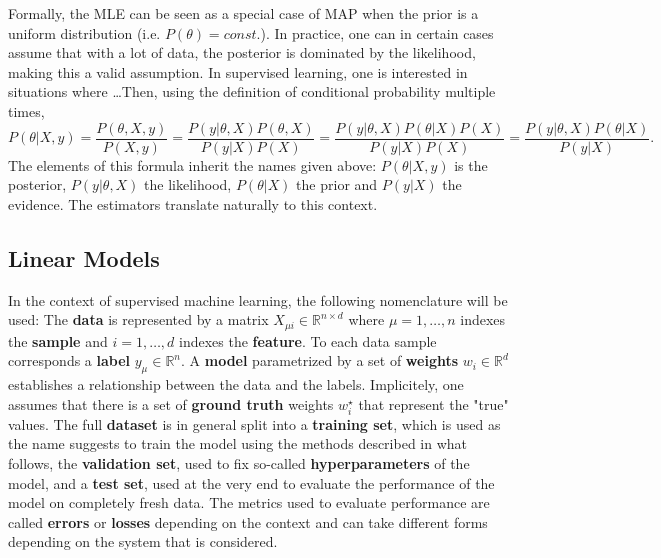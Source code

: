 \documentclass{article}
\begin{document}
Formally, the MLE can be seen as a special case of MAP when the prior is a uniform distribution (i.e. $P(\theta) = const.$). In practice, one can in certain cases assume that with a lot of data, the posterior is dominated by the likelihood, making this a valid assumption.
\restoregeometry
\noindent In supervised learning, one is interested in situations where \dots Then, using the definition of conditional probability multiple times,
\begin{equation}
    P(\theta | X,y) = \frac{P(\theta,X,y)}{P(X,y)}
    =
    \frac{P(y|\theta,X)P(\theta,X)}{P(y|X)P(X)}
    =
    \frac{P(y|\theta,X)P(\theta|X)P(X)}{P(y|X)P(X)}
    =
    \frac{P(y|\theta,X)P(\theta|X)}{P(y|X)}.
    \label{eq:posterior}
\end{equation}
The elements of this formula inherit the names given above: $P(\theta | X,y)$ is the posterior, $P(y|\theta,X)$ the likelihood, $P(\theta|X)$ the prior and $P(y|X)$ the evidence. The estimators translate naturally to this context.
\subsection{Linear Models}
In the context of supervised machine learning, the following nomenclature will be used:
The \textbf{data} is represented by a matrix $X_{\mu i} \in \mathbb{R}^{n \times d}$ where $\mu = 1,\dots,n$ indexes the \textbf{sample} and $i = 1,\dots,d$ indexes the \textbf{feature}. To each data sample corresponds a \textbf{label} $y_{\mu} \in \mathbb{R}^n$. A \textbf{model} parametrized by a set of \textbf{weights} $w_i \in \mathbb{R}^d$ establishes a relationship between the data and the labels. Implicitely, one assumes that there is a set of \textbf{ground truth} weights $w_i^{\star}$ that represent the "true" values. The full \textbf{dataset} is in general split into a \textbf{training set}, which is used as the name suggests to train the model using the methods described in what follows, the \textbf{validation set}, used to fix so-called \textbf{hyperparameters} of the model, and a \textbf{test set}, used at the very end to evaluate the performance of the model on completely fresh data. The metrics used to evaluate performance are called \textbf{errors} or \textbf{losses} depending on the context and can take different forms depending on the system that is considered.
\end{document}
